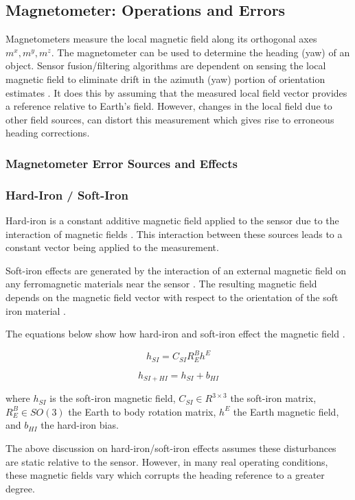 \subsection{Magnetometer: Operations and Errors}
Magnetometers measure the local magnetic field along its orthogonal axes $m^x,m^y,m^z$. 
The magnetometer can be used to determine the 
heading (yaw) of an object. Sensor fusion/filtering algorithms are dependent on sensing the local
magnetic field to eliminate drift in the azimuth (yaw) portion of orientation estimates \cite{bachmann_2004_an}.
It does this by assuming that the measured local field vector provides a reference 
relative to Earth's field. However, changes in the local field due to other field sources, can 
distort this measurement which gives rise to erroneous heading corrections. 

\subsubsection{Magnetometer Error Sources and Effects}
\label{sec:magerrors}
\subsubsection*{Hard-Iron / Soft-Iron}
Hard-iron is a constant additive magnetic field applied to the sensor 
due to the interaction of magnetic fields  \cite{luiz_2011_geometric}. 
This interaction between these sources leads to a constant vector being applied to the measurement. 


Soft-iron effects are generated by the interaction of an external magnetic field on any 
ferromagnetic materials near the sensor \cite{luiz_2011_geometric}. The resulting magnetic field depends
on the magnetic field vector with respect to the orientation of the soft iron material \cite{a2026_calibration}. 

The equations below show how hard-iron and soft-iron effect the magnetic field \cite{luiz_2011_geometric}.


\begin{equation}
h_{SI} = C_{SI}R_{E}^Bh^E
\end{equation}

\begin{equation}
    h_{SI+HI} = h_{SI} + b_{HI}
\end{equation}

where $h_{SI}$ is the soft-iron magnetic field, $C_{SI}\in{R}^{3\times3}$ the soft-iron matrix, $R_{E}^{B}\in SO(3)$ the Earth to body rotation matrix, $h^{E}$ the Earth magnetic field, and $b_{HI}$ the 
hard-iron bias.

The above discussion on hard-iron/soft-iron effects assumes these disturbances are static relative to the sensor. However, in many real operating conditions, these magnetic fields 
vary which corrupts the heading reference to a greater degree. 



